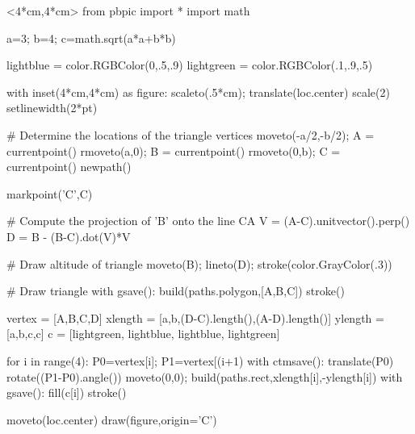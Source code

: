 \documentclass[12pt]{article}
\begin{document}
\hfil\begin{pbpic}<4*cm,4*cm>
from pbpic import *
import math

a=3; b=4; c=math.sqrt(a*a+b*b)

lightblue = color.RGBColor(0,.5,.9)
lightgreen = color.RGBColor(.1,.9,.5)

with inset(4*cm,4*cm) as figure:
  scaleto(.5*cm); translate(loc.center)
  scale(2)
  setlinewidth(2*pt)

  # Determine the locations of the triangle vertices
  moveto(-a/2,-b/2); A = currentpoint()
  rmoveto(a,0); B = currentpoint()
  rmoveto(0,b); C = currentpoint()
  newpath()

  markpoint('C',C)

  # Compute the projection of 'B' onto the line CA
  V = (A-C).unitvector().perp()
  D = B - (B-C).dot(V)*V

  # Draw altitude of triangle
  moveto(B); lineto(D);
  stroke(color.GrayColor(.3))

  # Draw triangle
  with gsave():
    build(paths.polygon,[A,B,C])
    stroke()

  vertex = [A,B,C,D]
  xlength = [a,b,(D-C).length(),(A-D).length()]
  ylength = [a,b,c,c]
  c = [lightgreen, lightblue, lightblue, lightgreen]

  for i in range(4):
    P0=vertex[i]; P1=vertex[(i+1)%
    with ctmsave():
      translate(P0)
      rotate((P1-P0).angle())
      moveto(0,0);
      build(paths.rect,xlength[i],-ylength[i])
    with gsave():
      fill(c[i])
    stroke()

moveto(loc.center)
draw(figure,origin='C')

\end{pbpic}
\end{document}
